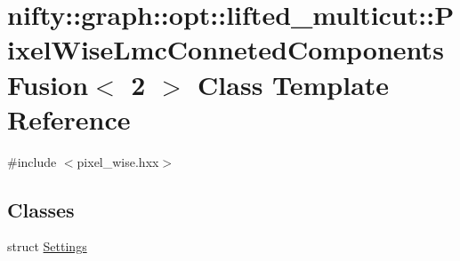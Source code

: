 \hypertarget{classnifty_1_1graph_1_1opt_1_1lifted__multicut_1_1PixelWiseLmcConnetedComponentsFusion_3_012_01_4}{}\section{nifty\+:\+:graph\+:\+:opt\+:\+:lifted\+\_\+multicut\+:\+:Pixel\+Wise\+Lmc\+Conneted\+Components\+Fusion$<$ 2 $>$ Class Template Reference}
\label{classnifty_1_1graph_1_1opt_1_1lifted__multicut_1_1PixelWiseLmcConnetedComponentsFusion_3_012_01_4}


{\ttfamily \#include $<$pixel\+\_\+wise.\+hxx$>$}

\subsection*{Classes}
\begin{DoxyCompactItemize}
\item 
struct \hyperlink{structnifty_1_1graph_1_1opt_1_1lifted__multicut_1_1PixelWiseLmcConnetedComponentsFusion_3_012_01_4_1_1Settings}{Settings}
\end{DoxyCompactItemize}
